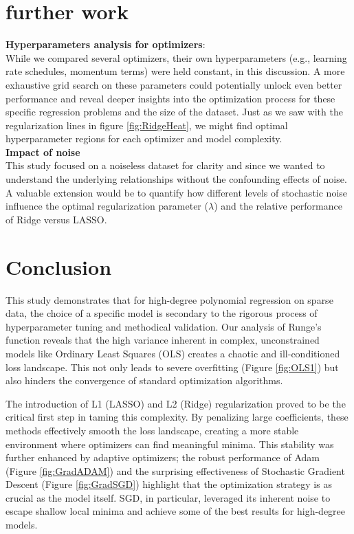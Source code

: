 \documentclass[twocolumn,aps]{revtex4}
\begin{document}
\section{further work}

\textbf{Hyperparameters analysis for optimizers}:
\\
While we compared several optimizers, their own hyperparameters (e.g., learning rate schedules, momentum terms) were held constant, in this discussion.
A more exhaustive grid search on these parameters could potentially unlock even better performance and reveal deeper insights into the optimization process for these specific regression problems and the size of the dataset.
Just as we saw with the regularization lines in figure \ref{fig:RidgeHeat}, we might find optimal hyperparameter regions for each optimizer and model complexity.
\\

\textbf{Impact of noise}
\\
This study focused on a noiseless dataset for clarity and since we wanted to understand the underlying relationships without the confounding effects of noise.
A valuable extension would be to quantify how different levels of stochastic noise influence the optimal regularization parameter ($\lambda$) and the relative performance of Ridge versus LASSO. 
\\

\section{Conclusion}\label{section:conclusion} 

This study demonstrates that for high-degree polynomial regression on sparse data, the choice of a specific model is secondary to the rigorous process of hyperparameter tuning and methodical validation. Our analysis of Runge's function reveals that the high variance inherent in complex, unconstrained models like Ordinary Least Squares (OLS) creates a chaotic and ill-conditioned loss landscape. This not only leads to severe overfitting (Figure \ref{fig:OLS1}) but also hinders the convergence of standard optimization algorithms.

The introduction of L1 (LASSO) and L2 (Ridge) regularization proved to be the critical first step in taming this complexity. By penalizing large coefficients, these methods effectively smooth the loss landscape, creating a more stable environment where optimizers can find meaningful minima. This stability was further enhanced by adaptive optimizers; the robust performance of Adam (Figure \ref{fig:GradADAM}) and the surprising effectiveness of Stochastic Gradient Descent (Figure \ref{fig:GradSGD}) highlight that the optimization strategy is as crucial as the model itself. SGD, in particular, leveraged its inherent noise to escape shallow local minima and achieve some of the best results for high-degree models.
\end{document}
